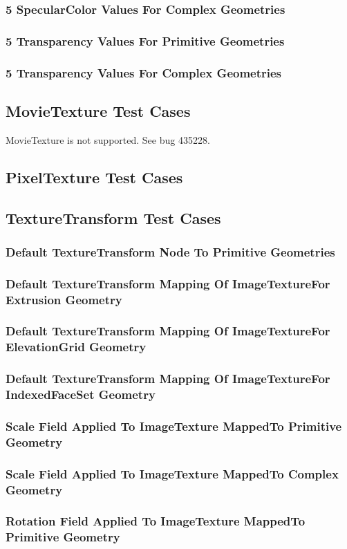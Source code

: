 \documentclass[12pt,letterpaper]{article}
\newcommand{\MatAA}{5 SpecularColor Values For Complex Geometries}
\newcommand{\MatAB}{5 Transparency Values For Primitive Geometries}
\newcommand{\MatAC}{5 Transparency Values For Complex Geometries}
\newcommand{\TTA}{Default TextureTransform Node To Primitive Geometries}
\newcommand{\TTBa}{Default TextureTransform Mapping Of ImageTexture}
\newcommand{\TTBb}{For Extrusion Geometry}
\newcommand{\TTCa}{Default TextureTransform Mapping Of ImageTexture}
\newcommand{\TTCb}{For ElevationGrid Geometry}
\newcommand{\TTDa}{Default TextureTransform Mapping Of ImageTexture}
\newcommand{\TTDb}{For IndexedFaceSet Geometry}
\newcommand{\TTEa}{Scale Field Applied To ImageTexture Mapped}
\newcommand{\TTEb}{To Primitive Geometry}
\newcommand{\TTFa}{Scale Field Applied To ImageTexture Mapped}
\newcommand{\TTFb}{To Complex Geometry}
\newcommand{\TTGa}{Rotation Field Applied To ImageTexture Mapped}
\newcommand{\TTGb}{To Primitive Geometry}
\begin{document}
\subsubsection{\MatAA}
\subsubsection{\MatAB}
\subsubsection{\MatAC}

\subsection{MovieTexture Test Cases}
MovieTexture is not supported. See bug 435228.

\subsection{PixelTexture Test Cases}

\subsection{TextureTransform Test Cases}

\subsubsection{\TTA}
\subsubsection{\TTBa \TTBb}
\subsubsection{\TTCa \TTCb}
\subsubsection{\TTDa \TTDb}
\subsubsection{\TTEa \TTEb}
\subsubsection{\TTFa \TTFb}
\subsubsection{\TTGa \TTGb}
\end{document}
